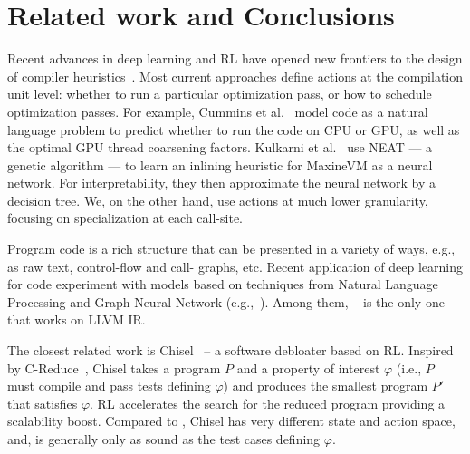 \section{Related work and Conclusions}\label{sec:future}

Recent advances in deep learning and RL have opened new frontiers to the design
of compiler heuristics~\cite{autotuning}. Most current approaches define actions
at the compilation unit level: whether to run a particular optimization pass, or
how to schedule optimization passes. For example, Cummins et al.~\cite{deeptune}
model code as a natural language problem to predict whether to run the code on
CPU or GPU, as well as the optimal GPU thread coarsening factors. Kulkarni et
al.~\cite{KulkarniCWS13} use NEAT --- a genetic algorithm --- to learn an
inlining heuristic for MaxineVM as a neural network. For interpretability, they
then approximate the neural network by a decision tree. We, on the other hand,
use actions at much lower granularity, focusing on specialization at each
call-site.

Program code is a rich structure that can be presented in a variety of ways,
e.g., as raw text, control-flow and call- graphs, etc. Recent application of
deep learning for code experiment with models based on techniques from Natural
Language Processing and Graph Neural Network (e.g.,~\cite{code2vec, inst2vec,
  code2seq, code2blah}). Among them, \insttovec~\cite{inst2vec} is the only one
that works on LLVM IR. %

The closest related work is Chisel~\cite{chisel} -- a software debloater based
on RL. Inspired by C-Reduce~\cite{creduce}, Chisel takes a program $P$ and a
property of interest $\varphi$ (i.e., $P$ must compile and pass tests defining
$\varphi$) and produces the smallest program $P'$ that satisfies $\varphi$. RL
accelerates the search for the reduced program providing a scalability boost.
Compared to \doccam, Chisel has very different state and action space, and, is generally
only as sound as the test cases defining $\varphi$.

